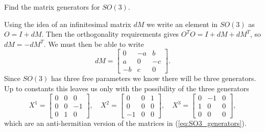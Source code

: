 \documentclass[notes.tex]{subfiles}
\begin{document}
\begin{Exercise}[label=ex:SO3_matrix_generators,difficulty={1}]
Find the matrix generators for $SO(3)$.
\end{Exercise}
\begin{Answer}
Using the idea of an infinitesimal matrix $dM$ we write an element in  $SO(3)$ as $O=I+dM$. Then the orthogonality requirements gives
$O^TO=I+dM+dM^T$, so $dM=-dM^T$. We must then be able to write
\[ dM= \left[\begin{matrix} 0 & -a & b \\  a & 0 & -c \\ -b & c & 0 \end{matrix}\right]. \]
Since  $SO(3)$ has three free parameters we know there will be three generators. Up to constants this leaves us only with the possibility of the three generators
\begin{equation}
X^1 =\left[\begin{matrix} 0 & 0 & 0 \\ 0 & 0 & -1 \\ 0 & 1 & 0  \end{matrix}\right], 
\quad X^2 =\left[\begin{matrix} 0 & 0 & 1 \\ 0 & 0 & 0 \\ -1 & 0 & 0  \end{matrix}\right], 
\quad X^3 =\left[\begin{matrix} 0 & -1 & 0 \\ 1 & 0 & 0 \\ 0 & 0 & 0  \end{matrix}\right],
\end{equation}
which are an anti-hermitian version of the matrices in (\ref{eq:SO3_generators}).
\end{Answer}
\end{document}
